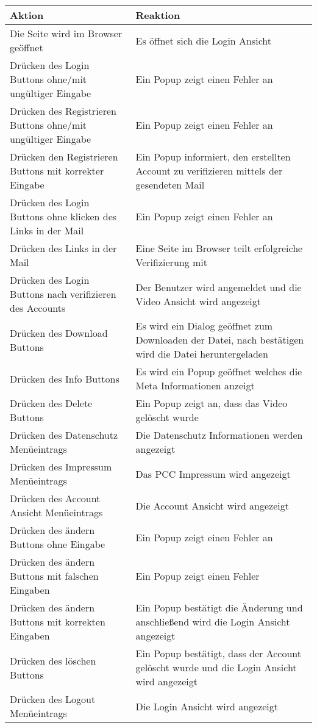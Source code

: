 \begin{longtable}{p{} | p{}}
\textbf{Aktion} & \textbf{Reaktion}\\
\hline
Die Seite wird im Browser geöffnet & Es öffnet sich die Login Ansicht\\
\hline
Drücken des Login Buttons ohne/mit ungültiger Eingabe & Ein Popup zeigt einen Fehler an\\
\hline
Drücken des Registrieren Buttons ohne/mit ungültiger Eingabe& Ein Popup zeigt einen Fehler an\\
\hline
Drücken den Registrieren Buttons mit korrekter Eingabe & Ein Popup informiert, den erstellten Account zu verifizieren mittels der gesendeten Mail\\
\hline  
Drücken des Login Buttons ohne klicken des Links in der Mail & Ein Popup zeigt einen Fehler an\\
\hline  
Drücken des Links in der Mail & Eine Seite im Browser teilt erfolgreiche Verifizierung mit\\
\hline
Drücken des Login Buttons nach verifizieren des Accounts & Der Benutzer wird angemeldet und die Video Ansicht wird angezeigt\\
\hline
Drücken des Download Buttons & Es wird ein Dialog geöffnet zum Downloaden der Datei, nach bestätigen wird die Datei heruntergeladen\\
\hline
Drücken des Info Buttons & Es wird ein Popup geöffnet welches die Meta Informationen anzeigt\\
\hline
Drücken des Delete Buttons & Ein Popup zeigt an, dass das Video gelöscht wurde\\
\hline
Drücken des Datenschutz Menüeintrags & Die Datenschutz Informationen werden angezeigt\\
\hline
Drücken des Impressum Menüeintrags & Das PCC Impressum wird angezeigt\\
\hline
Drücken des Account Ansicht Menüeintrags & Die Account Ansicht wird angezeigt\\
\hline
Drücken des ändern Buttons ohne Eingabe & Ein Popup zeigt einen Fehler an\\
\hline
Drücken des ändern Buttons mit falschen Eingaben & Ein Popup zeigt einen Fehler\\
\hline
Drücken des ändern Buttons mit korrekten Eingaben & Ein Popup bestätigt die Änderung und anschließend wird die Login Ansicht angezeigt\\
\hline
Drücken des löschen Buttons & Ein Popup bestätigt, dass der Account gelöscht wurde und die Login Ansicht wird angezeigt\\
\hline
Drücken des Logout Menüeintrags & Die Login Ansicht wird angezeigt\\
\hline

 \end{longtable}
